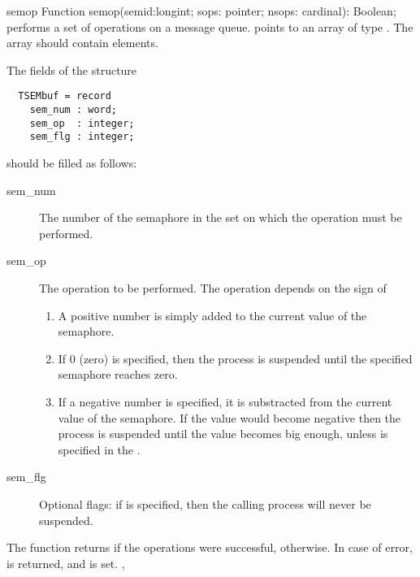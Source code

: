 \begin{function}{semop}
\Declaration
Function semop(semid:longint; sops: pointer; nsops: cardinal): Boolean;
\Description
{} performs a set of operations on a message queue.
 points to an array of type . The array should
contain  elements.

The fields of the  structure 
\begin{verbatim}
  TSEMbuf = record
    sem_num : word;
    sem_op  : integer;
    sem_flg : integer;
\end{verbatim}

should be filled as follows:
\begin{description}
\item[sem\_num] The number of the semaphore in the set on which the
operation must be performed.
\item[sem\_op] The operation to be performed. The operation depends on the
sign of 
\begin{enumerate}
\item A positive  number is simply added to the current value of the
semaphore.
\item If 0 (zero) is specified, then the process is suspended until the 
  specified semaphore reaches zero.
\item If a negative number is specified, it is substracted from the
current value of the semaphore. If the value would become negative
then the process is suspended until the value becomes big enough, unless
 is specified in the .
\end{enumerate}
\item[sem\_flg] Optional flags: if  is specified, then the
calling process will never be suspended.
\end{description}

The function returns  if the operations were successful,
 otherwise.
\Errors
In case of error,  is returned, and  is set.
\SeeAlso
{}, 
\end{function}

